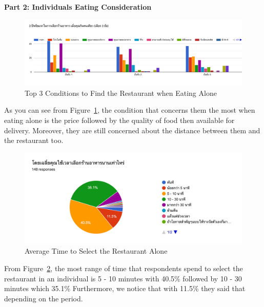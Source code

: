 \documentclass[12pt,oneside,openright,a4paper]{cpe-english-project}
\begin{document}
\newpage
\textbf{Part 2: Individuals Eating Consideration}

\begin{figure}[H]\centering
\includegraphics[width=350pt]{./images/A1Top3ConditionstoFindtheRestaurantwhenEatingAlone.png}
\caption{Top 3 Conditions to Find the Restaurant when Eating Alone}\label{fig:A1Top3ConditionstoFindtheRestaurantwhenEatingAlone}
\end{figure}\vspace{-24pt}

As you can see from Figure~\ref{fig:A1Top3ConditionstoFindtheRestaurantwhenEatingAlone}, the condition that concerns them the most when eating alone is the price followed by the quality of food then available for delivery. Moreover, they are still concerned about the distance between them and the restaurant too.

\begin{figure}[H]\centering
\includegraphics[width=350pt]{./images/A1AverageTimetoSelecttheRestaurantAlone.png}
\caption{Average Time to Select the Restaurant Alone}\label{fig:A1AverageTimetoSelecttheRestaurantAlone}
\end{figure}\vspace{-24pt}

From Figure~\ref{fig:A1AverageTimetoSelecttheRestaurantAlone}, the most range of time that respondents spend to select the restaurant in an individual is 5 - 10 minutes with 40.5\% followed by 10 - 30 minutes which 35.1\% Furthermore, we notice that with 11.5\% they said that depending on the period.
\end{document}
